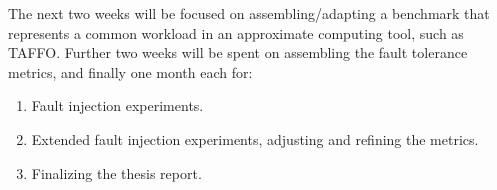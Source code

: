 The next two weeks will be focused on assembling/adapting a benchmark that represents a common workload in an approximate computing tool, such as TAFFO\citep{cherubin2019taffo}. 
Further two weeks will be spent on assembling the fault tolerance metrics, and finally one month each for:
\begin{enumerate}
    \item Fault injection experiments.
    \item Extended fault injection experiments, adjusting and refining the metrics.
    \item Finalizing the thesis report.
\end{enumerate}




